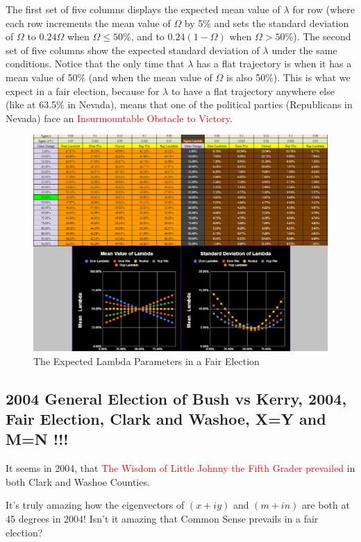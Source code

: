 \documentclass[preprint,13pt]{elsarticle}
\begin{document}
The first set of five columns displays the expected mean value of $\lambda$ for row (where each row increments the mean value of $\Omega$ by 5\% and sets the standard deviation of $\Omega$ to $0.24\Omega$ when $\Omega \le 50\%$, and to $0.24(1-\Omega)$ when $\Omega > 50\%$). The second set of five columns show the expected standard deviation of $\lambda$ under the same conditions. Notice that the only time that $\lambda$ has a flat trajectory is when it has a mean value of 50\% (and when the mean value of $\Omega$ is also 50\%). This is what we expect in a fair election, because for $\lambda$ to have a flat trajectory anywhere else (like at 63.5\% in Nevada), means that one of the political parties (Republicans in Nevada) face an \textcolor{red}{Insurmountable Obstacle to Victory}.
\begin{figure}[bp!]
\begin{center}
\caption{The Expected Lambda Parameters in a Fair Election}
\includegraphics[width=400pt]{FairLambdaStats.png}
\end{center}
\end{figure}
\newpage
\subsection{2004 General Election of Bush vs Kerry, 2004, Fair Election, Clark and Washoe, X=Y and M=N !!!}

It seems in 2004, that \textcolor{red}{The Wisdom of Little Johnny the Fifth Grader prevailed} in both Clark and Washoe Counties.  

It's truly amazing how the eigenvectors of $(x+iy)$ and $(m+in)$ are both at 45 degrees in 2004! Isn't it amazing that Common Sense prevails in a fair election? 
\end{document}
